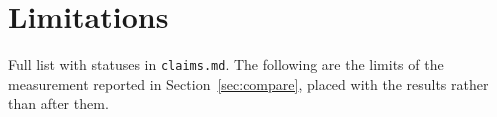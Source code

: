 \documentclass[11pt,a4paper]{article}
\begin{document}




















\section{Limitations}
\label{sec:limitations}

Full list with statuses in \texttt{claims.md}. The following are the limits of the measurement
reported in Section~\ref{sec:compare}, placed with the results rather than after them.
\end{document}
